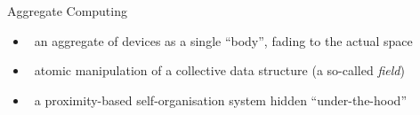\documentclass[8pt, aspectratio=169, handout]{beamer}
\begin{document}
\begin{frame}{Aggregate Computing}
  \begin{card}
    \begin{itemize}
      \item {}
      \faArrowRight \, an aggregate of devices as a single ``body'', fading to the actual space
      \item {}
      \faArrowRight \,  atomic manipulation of a collective data structure (a so-called \emph{field})
      \item {}
      \faArrowRight \, a proximity-based self-organisation system hidden “under-the-hood”
    \end{itemize}
  \end{card}
  \centering
\end{frame}
\end{document}
